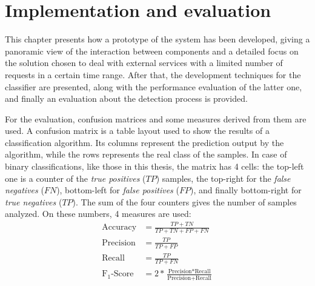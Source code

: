 \chapter{Implementation and evaluation}
\label{cha:results}
This chapter presents how a prototype of the system has been developed, giving a panoramic view of the interaction between components and a detailed focus on the solution chosen to deal with external services with a limited number of requests in a certain time range. After that, the development techniques for the classifier are presented, along with the performance evaluation of the latter one, and finally an evaluation about the detection process is provided.

For the evaluation, confusion matrices and some measures derived from them are used. A confusion matrix is a table layout used to show the results of a classification algorithm. Its columns represent the prediction output by the algorithm, while the rows represents the real class of the samples. In case of binary classifications, like those in this thesis, the matrix has 4 cells: the top-left one is a counter of the \emph{true positives} ($TP$) samples, the top-right for the \emph{false negatives} ($FN$), bottom-left for \emph{false positives} ($FP$), and finally bottom-right for \emph{true negatives} ($TP$). The sum of the four counters gives the number of samples analyzed. On these numbers, 4 measures are used:
\begin{equation*}
\begin{split}
\text{Accuracy} & = \frac{TP + TN}{TP + TN + FP + FN}\\
\text{Precision} & = \frac{TP}{TP + FP} \\ 
\text{Recall} & = \frac{TP}{TP + FN}\\
\text{F}_1\text{-Score} & = 2 * \frac{\text{Precision} * \text{Recall}}{\text{Precision} + \text{Recall}}
\end{split}
\end{equation*}

